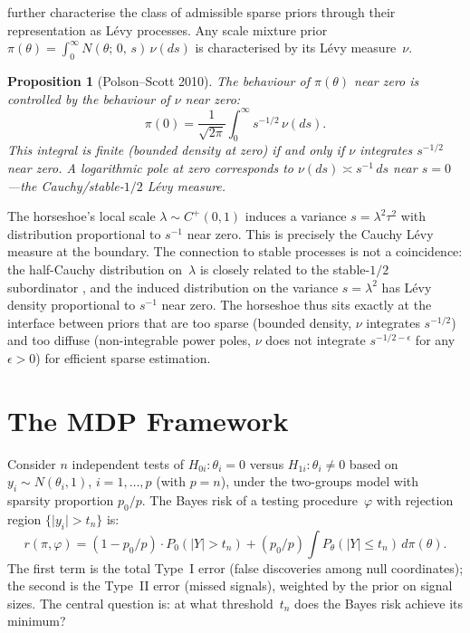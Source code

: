 \documentclass[12pt]{article}
\newtheorem{proposition}[theorem]{Proposition}
\newcommand{\abs}[1]{\lvert #1 \rvert}
\begin{document}
\citet{polson2010shrink} further characterise the class of admissible sparse priors through their representation as L\'evy processes. Any scale mixture prior $\pi(\theta) = \int_0^\infty N(\theta;\, 0,\, s)\, \nu(ds)$ is characterised by its L\'evy measure~$\nu$.

\begin{proposition}[Polson--Scott 2010]\label{prop:levy}
The behaviour of $\pi(\theta)$ near zero is controlled by the behaviour of $\nu$ near zero:
\begin{equation}\label{eq:levy}
  \pi(0) = \frac{1}{\sqrt{2\pi}} \int_0^\infty s^{-1/2}\, \nu(ds).
\end{equation}
This integral is finite (bounded density at zero) if and only if $\nu$ integrates $s^{-1/2}$ near zero. A logarithmic pole at zero corresponds to $\nu(ds) \asymp s^{-1}\, ds$ near $s = 0$---the Cauchy/stable-$1/2$ L\'evy measure.
\end{proposition}

The horseshoe's local scale $\lambda \sim C^+(0,1)$ induces a variance $s = \lambda^2 \tau^2$ with distribution proportional to $s^{-1}$ near zero. This is precisely the Cauchy L\'evy measure at the boundary. The connection to stable processes is not a coincidence: the half-Cauchy distribution on~$\lambda$ is closely related to the stable-$1/2$ subordinator \citep{polson2012halfcauchy}, and the induced distribution on the variance $s = \lambda^2$ has L\'evy density proportional to $s^{-1}$ near zero. The horseshoe thus sits exactly at the interface between priors that are too sparse (bounded density, $\nu$ integrates $s^{-1/2}$) and too diffuse (non-integrable power poles, $\nu$ does not integrate $s^{-1/2-\epsilon}$ for any $\epsilon > 0$) for efficient sparse estimation.


\section{The MDP Framework}\label{sec:mdp}

Consider $n$ independent tests of $H_{0i}: \theta_i = 0$ versus $H_{1i}: \theta_i \neq 0$ based on $y_i \sim N(\theta_i, 1)$, $i = 1, \ldots, p$ (with $p = n$), under the two-groups model with sparsity proportion $p_0/p$. The Bayes risk of a testing procedure~$\varphi$ with rejection region $\{\abs{y_i} > t_n\}$ is:
\begin{equation}\label{eq:bayes-risk}
  r(\pi, \varphi)
  = (1 - p_0/p) \cdot P_0(\abs{Y} > t_n)
  + (p_0/p) \int P_\theta(\abs{Y} \leq t_n)\, d\pi(\theta).
\end{equation}
The first term is the total Type~I error (false discoveries among null coordinates); the second is the Type~II error (missed signals), weighted by the prior on signal sizes. The central question is: at what threshold~$t_n$ does the Bayes risk achieve its minimum?
\end{document}
